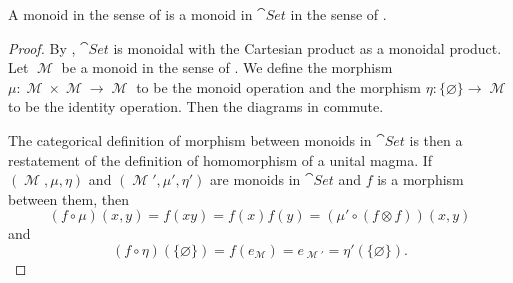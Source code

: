 \begin{proposition}\label{thm:monoids_are_monoids_in_set}
  A monoid in the sense of  is a monoid in \( \cat{Set} \) in the sense of .
\end{proposition}
\begin{proof}
  By , \( \cat{Set} \) is monoidal with the Cartesian product as a monoidal product. Let \( \mscrM \) be a monoid in the sense of . We define the morphism \( \mu: \mscrM \times \mscrM \to \mscrM \) to be the monoid operation and the morphism \( \eta: \{ \varnothing \} \to \mscrM \) to be the identity operation. Then the diagrams in  commute.

  The categorical definition of morphism between monoids in \( \cat{Set} \) is then a restatement of the definition of homomorphism of a unital magma. If \( (\mscrM, \mu, \eta) \) and \( (\mscrM', \mu', \eta') \) are monoids in \( \cat{Set} \) and \( f \) is a morphism between them, then
  \begin{equation*}
    (f \circ \mu)(x, y)
    =
    f(xy)
    =
    f(x) f(y)
    =
    (\mu' \circ (f \otimes f))(x, y)
  \end{equation*}
  and
  \begin{equation*}
    (f \circ \eta)(\{ \varnothing \})
    =
    f(e_{\mscrM})
    =
    e_{\mscrM'}
    =
    \eta'(\{ \varnothing \}).
  \end{equation*}
\end{proof}
